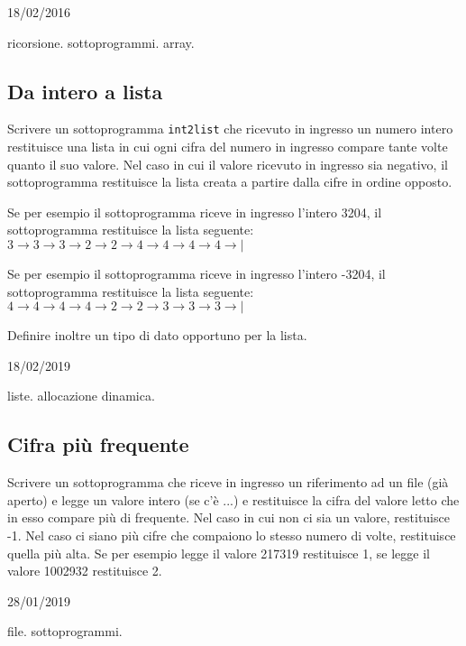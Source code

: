 \begin{esame}
18/02/2016
\end{esame}

\begin{tags}
ricorsione. sottoprogrammi. array.
\end{tags}



\subsection{Da intero a lista}
Scrivere un sottoprogramma \texttt{int2list} che ricevuto in ingresso un numero intero restituisce una lista in cui ogni cifra del numero in ingresso compare tante volte quanto il suo valore. 
Nel caso in cui il valore ricevuto in ingresso sia negativo, il sottoprogramma restituisce la lista creata a partire dalla cifre in ordine opposto.

Se per esempio il sottoprogramma riceve in ingresso l'intero 3204, il sottoprogramma restituisce la lista seguente:
$3 \rightarrow 3 \rightarrow 3 \rightarrow 2 \rightarrow 2 \rightarrow 4 \rightarrow 4 \rightarrow 4 \rightarrow 4 \rightarrow |$


Se per esempio il sottoprogramma riceve in ingresso l'intero -3204, il sottoprogramma restituisce la lista seguente:
$4 \rightarrow 4 \rightarrow 4 \rightarrow 4 \rightarrow 2 \rightarrow 2 \rightarrow 3 \rightarrow 3 \rightarrow 3 \rightarrow |$


Definire inoltre un tipo di dato opportuno per la lista.


\begin{esame}
18/02/2019
\end{esame}

\begin{tags}
liste. allocazione dinamica.
\end{tags}



\subsection{Cifra pi\`u frequente}
Scrivere un sottoprogramma che riceve in ingresso un riferimento ad un file (gi\`a aperto) e legge un valore intero (se c'\`e ...) e restituisce la cifra del valore letto che in esso compare pi\`u di frequente. Nel caso in cui non ci sia un valore, restituisce -1. 
Nel caso ci siano pi\`u cifre che compaiono lo stesso numero di volte, restituisce quella pi\`u alta.
Se per esempio legge il valore 217319 restituisce 1, se legge il valore 1002932 restituisce 2.

\begin{esame}
28/01/2019
\end{esame}

\begin{tags}
file. sottoprogrammi.
\end{tags}


